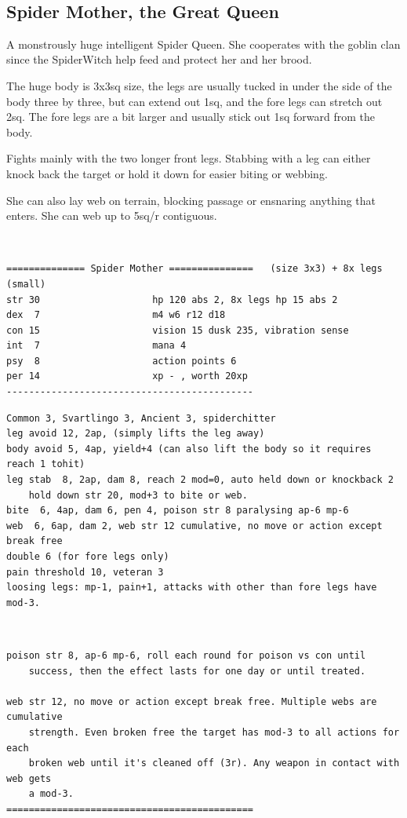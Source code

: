 \


\goodbreak
\subsection*{Spider Mother, the Great Queen}

A monstrously huge intelligent Spider Queen. She cooperates with the goblin clan since the SpiderWitch help feed and protect her and her brood.

The huge body is 3x3sq size, the legs are usually tucked in under the side of the body three by three, but can extend out 1sq, and the fore legs can stretch out 2sq. The fore legs are a bit larger and usually stick out 1sq forward from the body.

Fights mainly with the two longer front legs. Stabbing with a leg can either knock back the target or hold it down for easier biting or webbing.

She can also lay web on terrain, blocking passage or ensnaring anything that enters. She can web up to 5sq/r contiguous.

\

\small \begin{samepage} \begin{verbatim}
============== Spider Mother ===============   (size 3x3) + 8x legs (small)
str 30                    hp 120 abs 2, 8x legs hp 15 abs 2
dex  7                    m4 w6 r12 d18
con 15                    vision 15 dusk 235, vibration sense
int  7                    mana 4
psy  8                    action points 6
per 14                    xp - , worth 20xp
--------------------------------------------
\end{verbatim} \goodbreak \begin{verbatim}
Common 3, Svartlingo 3, Ancient 3, spiderchitter
leg avoid 12, 2ap, (simply lifts the leg away)
body avoid 5, 4ap, yield+4 (can also lift the body so it requires reach 1 tohit)
leg stab  8, 2ap, dam 8, reach 2 mod=0, auto held down or knockback 2
    hold down str 20, mod+3 to bite or web.
bite  6, 4ap, dam 6, pen 4, poison str 8 paralysing ap-6 mp-6
web  6, 6ap, dam 2, web str 12 cumulative, no move or action except break free
double 6 (for fore legs only)
pain threshold 10, veteran 3
loosing legs: mp-1, pain+1, attacks with other than fore legs have mod-3.
\end{verbatim} \end{samepage}   \   \goodbreak \begin{samepage} \begin{verbatim}
poison str 8, ap-6 mp-6, roll each round for poison vs con until
    success, then the effect lasts for one day or until treated.

web str 12, no move or action except break free. Multiple webs are cumulative
    strength. Even broken free the target has mod-3 to all actions for each
    broken web until it's cleaned off (3r). Any weapon in contact with web gets
    a mod-3.
============================================
\end{verbatim} \end{samepage} \normalsize

